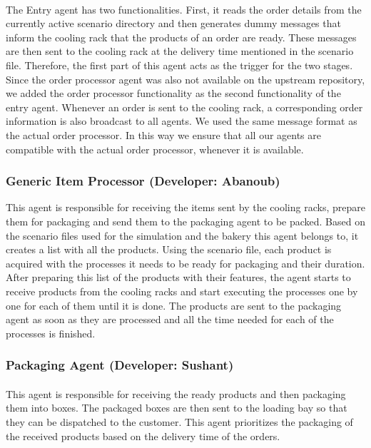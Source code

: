 \documentclass[11pt, a4paper]{article}
\begin{document}
\paragraph{}
The Entry agent has two functionalities. First, it reads the order details from the currently active scenario directory and then generates dummy messages that inform the cooling rack that the products of an order are ready. These messages are then sent to the cooling rack at the delivery time mentioned in the scenario file. Therefore, the first part of this agent acts as the trigger for the two stages. Since the order processor agent was also not available on the upstream repository, we added the order processor functionality as the second functionality of the entry agent. Whenever an order is sent to the cooling rack, a corresponding order information is also broadcast to all agents. We used the same  message format as the actual order processor. In this way we ensure that all our agents are compatible with the actual order processor, whenever it is available.

\subsubsection{Generic Item Processor (Developer: Abanoub)}
This agent is responsible for receiving the items sent by the cooling racks, prepare them for packaging and send them to the packaging agent to be packed. Based on the scenario files used for the simulation and the bakery this agent belongs to, it creates a list with all the products. Using the scenario file, each product is acquired with the processes it needs to be ready for packaging and their duration. After preparing this list of the products with their features, the agent starts to receive products from the cooling racks and start executing the processes one by one for each of them until it is done. The products are sent to the packaging agent as soon as they are processed and all the time needed for each of the processes is finished.
\subsubsection{Packaging Agent (Developer: Sushant)}
\paragraph{}
This agent is responsible for receiving the ready products and then packaging them into boxes. The packaged boxes are then sent to the loading bay so that they can be dispatched to the customer. This agent prioritizes the packaging of the received products based on the delivery time of the orders. 
\end{document}
